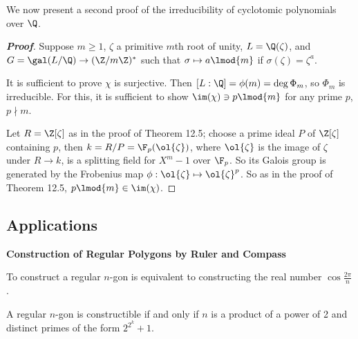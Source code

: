 We now present a second proof of the irreducibility of cyclotomic polynomials over $\Q$.

\begin{proof}[\bf Proof]
Suppose $m \geq 1$, $\zeta$ a primitive $m$th root of unity, $L = \Q(\zeta )$, and $G = \gal(L/\Q) \to (\Z/m\Z)^*$ such that $\sigma \mapsto a\lmod{m}$ if $\sigma(\zeta ) = \zeta^a$.

It is sufficient to prove $\chi$ is surjective. Then $[L : \Q] = \phi(m) = \deg \Phi_m$, so $\Phi_m$ is irreducible. For this, it is sufficient to show $\im(\chi) \ni p \lmod{m}$ for any prime $p$, $p \nmid m$.

Let $R = \Z[\zeta ]$ as in the proof of Theorem 12.5; choose a prime ideal $P$ of $\Z[\zeta ]$ containing $p$, then $k = R/P = \F_p(\ol{\zeta} )$, where $\ol{\zeta}$ is the image of $\zeta$ under $R \to k$, is a splitting field for $X^m - 1$ over $\F_p$. So its Galois group is generated by the Frobenius map $\phi: \ol{\zeta} \mapsto \ol{\zeta}^p$. So as in the proof of Theorem 12.5, $p \lmod{m} \in \im(\chi)$.
\end{proof}


\subsection{Applications}

{\bf Construction of Regular Polygons by Ruler and Compass}

To construct a regular $n$-gon is equivalent to constructing the real number $\cos \frac {2\pi }n$.

\begin{theorem}[Gauss]
A regular $n$-gon is constructible if and only if $n$ is a product of a power of 2 and distinct primes of the form $2^{2^k} + 1$.
\end{theorem}

